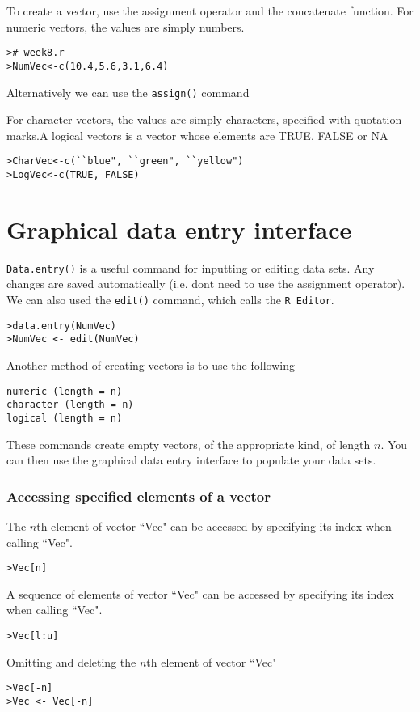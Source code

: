 \documentclass[a4paper,12pt]{article}
\begin{document}
To create a vector, use the assignment operator and the concatenate function.
For numeric vectors, the values are simply numbers.

\begin{verbatim}
># week8.r
>NumVec<-c(10.4,5.6,3.1,6.4)
\end{verbatim}

Alternatively we can use the \texttt{assign()} command

For character vectors, the values are simply characters, specified with
quotation marks.A logical vectors is a vector whose elements are TRUE, FALSE or NA

\begin{verbatim}
>CharVec<-c(``blue", ``green", ``yellow")
>LogVec<-c(TRUE, FALSE)
\end{verbatim}

\section{Graphical data entry interface}

\texttt{Data.entry()} is a useful  command for inputting or editing data sets. Any
changes are saved automatically (i.e. dont need to use the assignment
operator). We can also used the \texttt{edit()} command, which calls the \texttt{R Editor}.

\begin{verbatim}
>data.entry(NumVec)
>NumVec <- edit(NumVec)
\end{verbatim}

Another method of creating vectors is to use the following
\begin{verbatim}
numeric (length = n)
character (length = n)
logical (length = n)
\end{verbatim}
These commands create empty vectors, of the appropriate kind, of length $n$. You can then use the graphical data entry interface to populate your data sets.

\subsubsection{Accessing specified elements of a vector}

The $n$th element of vector ``Vec" can be accessed by specifying its index when
calling ``Vec".
\begin{verbatim}>Vec[n]
\end{verbatim}
A sequence of  elements of vector ``Vec" can be accessed by specifying its index
when calling ``Vec".
\begin{verbatim}>Vec[l:u]
\end{verbatim}
Omitting and deleting the $n$th element of vector ``Vec"
\begin{verbatim}
>Vec[-n]
>Vec <- Vec[-n]
\end{verbatim}
\end{document}

